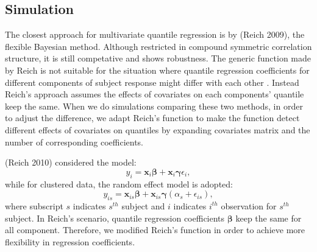 \documentclass{article}
\begin{document}
\subsection{Simulation}
The closest approach for multivariate quantile regression is by (Reich
2009), the flexible Bayesian method. Although restricted in compound
symmetric correlation structure, it is still competative and shows
robustness. The generic function made by Reich is not suitable for the
situation where quantile regression coefficients for different
components of subject response might differ with each other . Instead
Reich's approach assumes the effects of covariates on each components'
quantile keep the same. When we do simulations comparing these two
methods, in order to adjust the difference, we adapt Reich's function
to make the function detect different effects of covariates on
quantiles by expanding covariates matrix and the number of
corresponding coefficients.  

(Reich 2010) considered the model:
\begin{equation}\label{eq:reich:uni}
y_i = \bm{x}_i\bm{\beta} + \bm{x}_i \bm{\gamma}\epsilon_i,
\end{equation}
while for clustered data, the random effect model is adopted:
\begin{equation}\label{eq:reich:mul}
y_{is} = \bm{x}_{is} \bm{\beta} + \bm{x}_{is} \bm{\gamma} (\alpha_s +
\epsilon_{is}), 
\end{equation}
where subscript $s$ indicates $s^{th}$ subject and $i$ indicates
$i^{th}$ observation for $s^{th}$ subject. In Reich's scenario,
quantile regression coefficients $\bm{\beta}$ keep the same for all
component. Therefore, we modified Reich's function in order to achieve
more flexibility in regression coefficients.  
\end{document}
